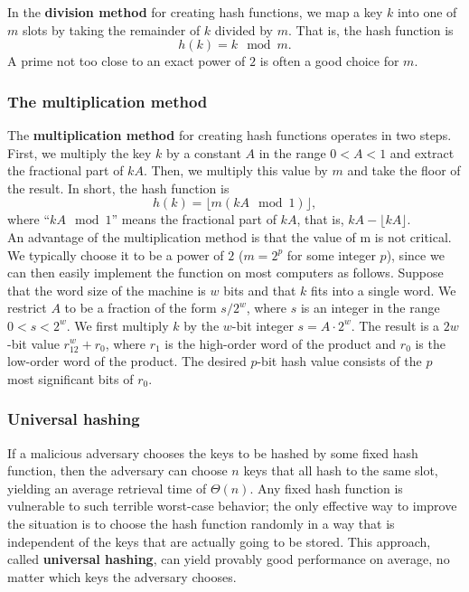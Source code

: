 \documentclass[12pt]{article}
\begin{document}
In the \textbf {division method} for creating hash functions, we map a key $k$ into one of $m$ slots by taking the remainder of $k$ divided by $m$. That is, the hash function is
\begin{equation*}
  h(k) = k \mod m.
\end{equation*}
A prime not too close to an exact power of $2$ is often a good choice for $m$.

\subsubsection{The multiplication method}

The \textbf {multiplication method} for creating hash functions operates in two steps. First, we multiply the key $k$ by a constant $A$ in the range $0 < A < 1$ and extract the fractional part of $kA$. Then, we multiply this value by $m$ and take the floor of the result. In short, the hash function is
\begin{equation*}
  h(k) = \lfloor m (kA \mod 1) \rfloor,
\end{equation*}
where ``$kA \mod 1$'' means the fractional part of $kA$, that is, $kA - \lfloor kA \rfloor$. \\

An advantage of the multiplication method is that the value of m is not critical. We typically choose it to be a power of $2$ ($m = 2^p$ for some integer $p$), since we can then easily implement the function on most computers as follows. Suppose that the word size of the machine is $w$ bits and that $k$ fits into a single word. We restrict $A$ to be a fraction of the form $s/2^w$, where $s$ is an integer in the range $0 < s < 2^w$. We first multiply $k$ by the $w$-bit integer $s = A \cdot 2^w$. The result is a $2w$-bit value $r_12^w+r_0$, where $r_1$ is the high-order word of the product and $r_0$ is the low-order word of the product. The desired $p$-bit hash value consists of the $p$ most significant bits of $r_0$.

\subsubsection{Universal hashing}

If a malicious adversary chooses the keys to be hashed by some fixed hash function, then the adversary can choose $n$ keys that all hash to the same slot, yielding an average retrieval time of $\Theta(n)$. Any fixed hash function is vulnerable to such terrible worst-case behavior; the only effective way to improve the situation is to choose the hash function randomly in a way that is independent of the keys that are actually going to be stored. This approach, called \textbf {universal hashing}, can yield provably good performance on average, no matter which keys the adversary chooses. \\
\end{document}
